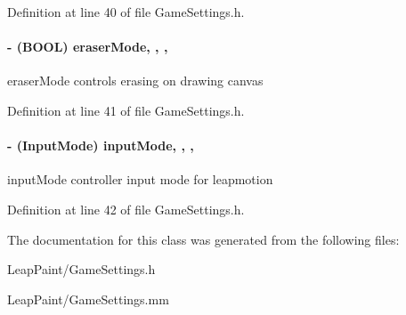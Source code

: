 Definition at line 40 of file Game\-Settings.\-h.

\hypertarget{interface_game_settings_ab192ff4717d84e69f4e3a32a4e38d6b8}{
\paragraph[{eraser\-Mode}]{\setlength{\rightskip}{0pt plus 5cm}-\/ (B\-O\-O\-L) eraser\-Mode\hspace{0.3cm}{\ttfamily [read]}, {\ttfamily [write]}, {\ttfamily [nonatomic]}, {\ttfamily [assign]}}}\label{d1/d0c/interface_game_settings_ab192ff4717d84e69f4e3a32a4e38d6b8}
eraser\-Mode controls erasing on drawing canvas 

Definition at line 41 of file Game\-Settings.\-h.

\hypertarget{interface_game_settings_a57e428fbdeeb3dbffa09bb7ffcf6b057}{
\paragraph[{input\-Mode}]{\setlength{\rightskip}{0pt plus 5cm}-\/ (Input\-Mode) input\-Mode\hspace{0.3cm}{\ttfamily [read]}, {\ttfamily [write]}, {\ttfamily [nonatomic]}, {\ttfamily [assign]}}}\label{d1/d0c/interface_game_settings_a57e428fbdeeb3dbffa09bb7ffcf6b057}
input\-Mode controller input mode for leapmotion 

Definition at line 42 of file Game\-Settings.\-h.



The documentation for this class was generated from the following files\-:\begin{DoxyCompactItemize}
\item 
Leap\-Paint/Game\-Settings.\-h\item 
Leap\-Paint/Game\-Settings.\-mm\end{DoxyCompactItemize}

